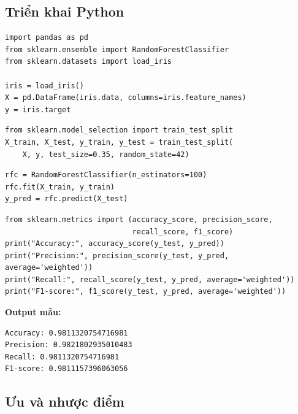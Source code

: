 \subsection{Triển khai Python}

\begin{vidu}[title={Bước 1--2: Import và nạp Iris}]
\begin{lstlisting}
import pandas as pd
from sklearn.ensemble import RandomForestClassifier
from sklearn.datasets import load_iris

iris = load_iris()
X = pd.DataFrame(iris.data, columns=iris.feature_names)
y = iris.target
\end{lstlisting}
\end{vidu}

\begin{vidu}[title={Bước 3: Tiền xử lý và chia dữ liệu}]
\begin{lstlisting}
from sklearn.model_selection import train_test_split
X_train, X_test, y_train, y_test = train_test_split(
    X, y, test_size=0.35, random_state=42)
\end{lstlisting}
\end{vidu}

\begin{vidu}[title={Bước 4--5: Huấn luyện và dự đoán}]
\begin{lstlisting}
rfc = RandomForestClassifier(n_estimators=100)
rfc.fit(X_train, y_train)
y_pred = rfc.predict(X_test)
\end{lstlisting}
\end{vidu}

\begin{vidu}[title={Bước 6: Đánh giá}]
\begin{lstlisting}
from sklearn.metrics import (accuracy_score, precision_score,
                             recall_score, f1_score)
print("Accuracy:", accuracy_score(y_test, y_pred))
print("Precision:", precision_score(y_test, y_pred, average='weighted'))
print("Recall:", recall_score(y_test, y_pred, average='weighted'))
print("F1-score:", f1_score(y_test, y_pred, average='weighted'))
\end{lstlisting}

\textbf{Output mẫu:}
\begin{verbatim}
Accuracy: 0.9811320754716981
Precision: 0.9821802935010483
Recall: 0.9811320754716981
F1-score: 0.9811157396063056
\end{verbatim}
\end{vidu}

\subsection{Ưu và nhược điểm}

